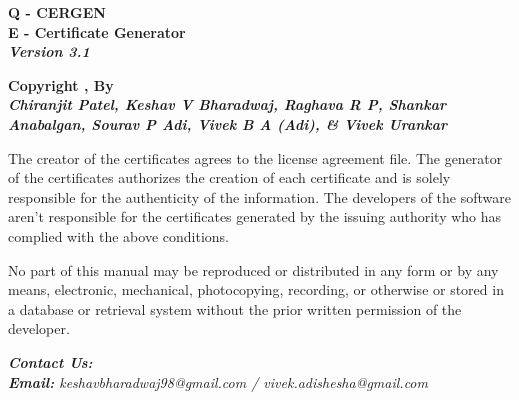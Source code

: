 

\begin{titlingpage}
	
\vspace{2cm}

\centering
{
	\Large{
		\textbf{Q - CERGEN}\\
		\textbf{E - Certificate Generator}\\
		\textbf{\textit{Version 3.1}}}
	\vspace{2cm}
	
	\Large\textbf{Copyright ,  By}\\
	\vspace{0.5cm}
	\large\textbf{\textit{Chiranjit Patel, Keshav V Bharadwaj, Raghava R P, Shankar Anabalgan, Sourav P Adi, Vivek B A (Adi), \& Vivek Urankar}}
	\vspace{2.5cm}
}


The creator of the certificates agrees to the license agreement file. The generator of the certificates authorizes the creation of each certificate and is solely responsible for the authenticity of the information. The developers of the software aren't responsible for the certificates generated by the issuing authority who has complied with the above conditions.

\vspace{2cm}

No part of this manual may be reproduced or distributed in any form or by any means, electronic, mechanical, photocopying, recording, or otherwise or stored in a database or retrieval system without the prior written permission of the developer.

\vspace{0.5cm}

\begin{flushleft}
	\large\textit{\textbf{Contact Us:}}\\
	\textit{\textbf{Email:} keshavbharadwaj98@gmail.com / vivek.adishesha@gmail.com}\\
\end{flushleft}
	
	
	
	
\end{titlingpage}


